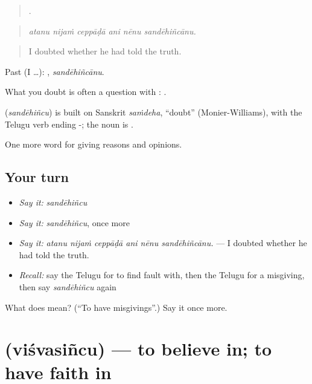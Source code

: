 \begin{quote}
     .
\end{quote}

\begin{quote}
\emph{atanu nijaṁ ceppāḍā ani nēnu sandēhiñcānu.}
\end{quote}

\begin{quote}
I doubted whether he had told the truth.
\end{quote}

Past (I …): , \emph{sandēhiñcānu}.

What you doubt is often a question with :   .

\begin{cousinweb}
\textbf{} (\emph{sandēhiñcu}) is built on Sanskrit \emph{saṁdeha}, \textquotedblleft{}doubt\textquotedblright{} (Monier-Williams), with the Telugu verb ending -; the noun is .
\end{cousinweb}

\begin{grammarlens}[title={What you've built}]
One more word for giving reasons and opinions.
\end{grammarlens}

\subsection*{Your turn}
\begin{itemize}
\raggedright
  \item \emph{Say it:} \emph{sandēhiñcu}
  \item \emph{Say it:} \emph{sandēhiñcu}, once more
  \item \emph{Say it:} \emph{atanu nijaṁ ceppāḍā ani nēnu sandēhiñcānu.} — I doubted whether he had told the truth.
  \item \emph{Recall:} say the Telugu for to find fault with, then the Telugu for a misgiving, then say \emph{sandēhiñcu} again
\end{itemize}

\begin{tcolorbox}[breakable,colback=teal!4,colframe=teal!35!black,title={Before you move on}]
What does  mean? (\textquotedblleft{}To have misgivings\textquotedblright{}.) Say it once more.
\end{tcolorbox}
\section[\texorpdfstring{\te{విశ్వసించు} (viśvasiñcu)}{విశ్వసించు (viśvasiñcu)}]{ (viśvasiñcu) — to believe in; to have faith in}

